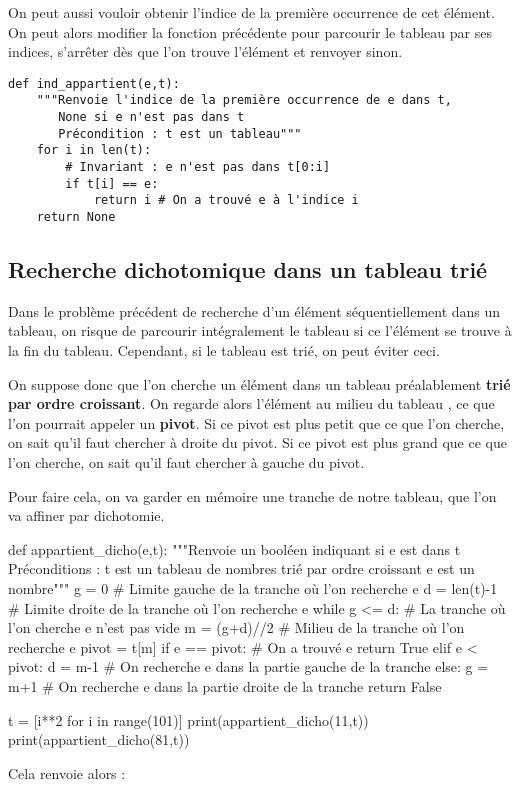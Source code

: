On peut aussi vouloir obtenir l'indice de la première occurrence de cet élément.
On peut alors modifier la fonction précédente pour parcourir le tableau par ses indices, s'arrêter 
dès que l'on trouve l'élément et renvoyer  sinon.
\begin{lstlisting}
def ind_appartient(e,t):
    """Renvoie l'indice de la première occurrence de e dans t,
       None si e n'est pas dans t
       Précondition : t est un tableau"""
    for i in len(t):
        # Invariant : e n'est pas dans t[0:i]
        if t[i] == e:
            return i # On a trouvé e à l'indice i
    return None
\end{lstlisting}


\subsection{Recherche dichotomique dans un tableau trié}

Dans le problème précédent de recherche d'un élément séquentiellement dans un tableau, on risque de parcourir intégralement le tableau si ce l'élément se trouve à la fin du tableau. 
Cependant, si le tableau est trié, on peut éviter ceci. 

On suppose donc que l'on cherche un élément dans un tableau préalablement \textbf{trié par ordre croissant}. On regarde alors l'élément \og au milieu du tableau \fg{}, ce que l'on pourrait appeler un  \textbf{pivot}. 
Si ce pivot est plus petit que ce que l'on cherche, on sait qu'il faut chercher à droite du pivot. 
Si ce pivot est plus grand que ce que l'on cherche, on sait qu'il faut chercher à gauche du pivot. 

Pour faire cela, on va garder en mémoire une tranche de notre tableau, que l'on va affiner par dichotomie. 

\begin{pyverbatim}
def appartient_dicho(e,t):
    """Renvoie un booléen indiquant si e est dans t
       Préconditions : t est un tableau de nombres trié par ordre croissant
                       e est un nombre"""
    g = 0 # Limite gauche de la tranche où l'on recherche e
    d = len(t)-1 # Limite droite de la tranche où l'on recherche e
    while g <= d: # La tranche où l'on cherche e n'est pas vide
        m = (g+d)//2 # Milieu de la tranche où l'on recherche e
        pivot = t[m] 
        if e == pivot: # On a trouvé e
            return True
        elif e < pivot: 
            d = m-1 # On recherche e dans la partie gauche de la tranche
        else:
            g = m+1 # On recherche e dans la partie droite de la tranche
    return False
    
t = [i**2 for i in range(101)]
print(appartient_dicho(11,t))
print(appartient_dicho(81,t))
\end{pyverbatim}
Cela renvoie alors :
\begin{quote}
\end{quote}


